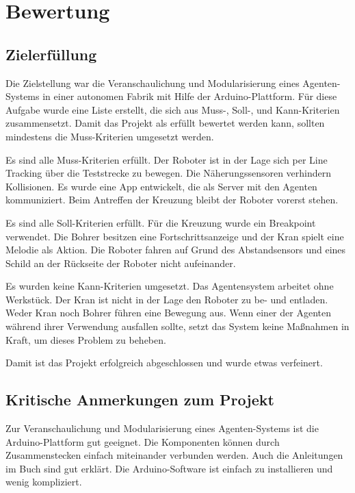 \chapter{Bewertung}


\section{Zielerfüllung}

Die Zielstellung war die Veranschaulichung und Modularisierung eines Agenten-Systems in einer autonomen Fabrik mit Hilfe der Arduino-Plattform. Für diese Aufgabe wurde eine Liste erstellt, die sich aus Muss-, Soll-, und Kann-Kriterien zusammensetzt. Damit das Projekt als erfüllt bewertet werden kann, sollten mindestens die Muss-Kriterien umgesetzt werden.

Es sind alle Muss-Kriterien erfüllt. Der Roboter ist in der Lage sich per Line Tracking über die Teststrecke zu bewegen. Die Näherungssensoren verhindern Kollisionen. Es wurde eine App entwickelt, die als Server mit den Agenten kommuniziert. Beim Antreffen der Kreuzung bleibt der Roboter vorerst stehen.

Es sind alle Soll-Kriterien erfüllt. Für die Kreuzung wurde ein Breakpoint verwendet. Die Bohrer besitzen eine Fortschrittsanzeige und der Kran spielt eine Melodie als Aktion. Die Roboter fahren auf Grund des Abstandsensors und eines Schild an der Rückseite der Roboter nicht aufeinander.

Es wurden keine Kann-Kriterien umgesetzt. Das Agentensystem arbeitet ohne Werkstück. Der Kran ist nicht in der Lage den Roboter zu be- und entladen. Weder Kran noch Bohrer führen eine Bewegung aus. Wenn einer der Agenten während ihrer Verwendung ausfallen sollte, setzt das System keine Maßnahmen in Kraft, um dieses Problem zu beheben.

Damit ist das Projekt erfolgreich abgeschlossen und wurde etwas verfeinert.

\section{Kritische Anmerkungen zum Projekt}

Zur Veranschaulichung und Modularisierung eines Agenten-Systems ist die Arduino-Plattform gut geeignet. Die Komponenten können durch Zusammenstecken einfach miteinander verbunden werden. Auch die Anleitungen im Buch sind gut erklärt. Die Arduino-Software ist einfach zu installieren und wenig kompliziert.

